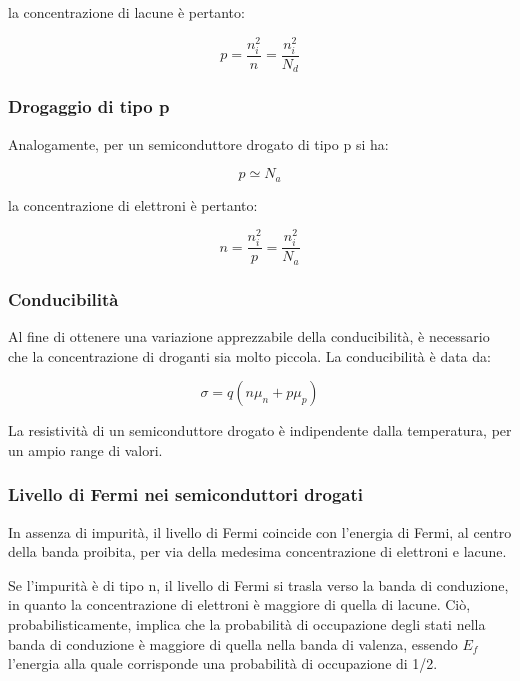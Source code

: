 \documentclass{article}
\begin{document}
la concentrazione di lacune è pertanto:

\begin{equation}
    p = \frac{n_i^2}{n} = \frac{n_i^2}{N_d}
\end{equation}

\subsubsection{Drogaggio di tipo p}

Analogamente, per un semiconduttore drogato di tipo p si ha:

\begin{equation}
    p \simeq N_a
\end{equation}

la concentrazione di elettroni è pertanto:

\begin{equation}
    n = \frac{n_i^2}{p} = \frac{n_i^2}{N_a}
\end{equation}

\subsubsection{Conducibilità}

Al fine di ottenere una variazione apprezzabile della conducibilità, è necessario che la concentrazione di droganti sia molto piccola.
La conducibilità è data da:

\begin{equation}
    \sigma = q(n \mu_n + p \mu_p)
\end{equation}

La resistività di un semiconduttore drogato è indipendente dalla temperatura, per un ampio range di valori.

\subsubsection{Livello di Fermi nei semiconduttori drogati}

In assenza di impurità, il livello di Fermi coincide con l'energia di Fermi, al centro della banda proibita,
per via della medesima concentrazione di elettroni e lacune.

Se l'impurità è di tipo n, il livello di Fermi si trasla verso la banda di conduzione, in quanto la concentrazione di elettroni è maggiore di quella di lacune.
Ciò, probabilisticamente, implica che la probabilità di occupazione degli stati nella banda di conduzione è maggiore di quella nella banda di valenza,
essendo $E_f$ l'energia alla quale corrisponde una probabilità di occupazione di 1/2.
\end{document}
